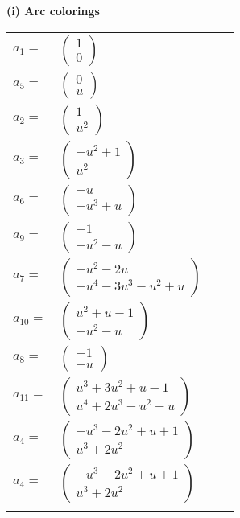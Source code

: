 \documentclass[1p]{elsarticle_modified}
\theoremstyle{definition}
\begin{document}
\flushleft \textbf{(i) Arc colorings}\\
\begin{tabular}{m{7pt} m{180pt} m{7pt} m{180pt} }
\flushright $a_{1}=$&$\begin{pmatrix}1\\0\end{pmatrix}$ \\
\flushright $a_{5}=$&$\begin{pmatrix}0\\u\end{pmatrix}$ \\
\flushright $a_{2}=$&$\begin{pmatrix}1\\u^2\end{pmatrix}$ \\
\flushright $a_{3}=$&$\begin{pmatrix}- u^2+1\\u^2\end{pmatrix}$ \\
\flushright $a_{6}=$&$\begin{pmatrix}- u\\- u^3+u\end{pmatrix}$ \\
\flushright $a_{9}=$&$\begin{pmatrix}-1\\- u^2- u\end{pmatrix}$ \\
\flushright $a_{7}=$&$\begin{pmatrix}- u^2-2 u\\- u^4-3 u^3- u^2+u\end{pmatrix}$ \\
\flushright $a_{10}=$&$\begin{pmatrix}u^2+u-1\\- u^2- u\end{pmatrix}$ \\
\flushright $a_{8}=$&$\begin{pmatrix}-1\\- u\end{pmatrix}$ \\
\flushright $a_{11}=$&$\begin{pmatrix}u^3+3 u^2+u-1\\u^4+2 u^3- u^2- u\end{pmatrix}$ \\
\flushright $a_{4}=$&$\begin{pmatrix}- u^3-2 u^2+u+1\\u^3+2 u^2\end{pmatrix}$\\ \flushright $a_{4}=$&$\begin{pmatrix}- u^3-2 u^2+u+1\\u^3+2 u^2\end{pmatrix}$\\&\end{tabular}
\end{document}
